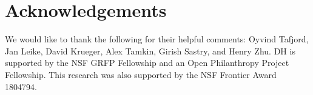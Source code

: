 



\newpage
\section*{Acknowledgements}
We would like to thank the following for their helpful comments: Oyvind Tafjord, Jan Leike, David Krueger, Alex Tamkin, Girish Sastry, and Henry Zhu. DH is supported by the NSF GRFP Fellowship and an Open Philanthropy Project Fellowship. This research was also supported by the NSF Frontier Award 1804794.
